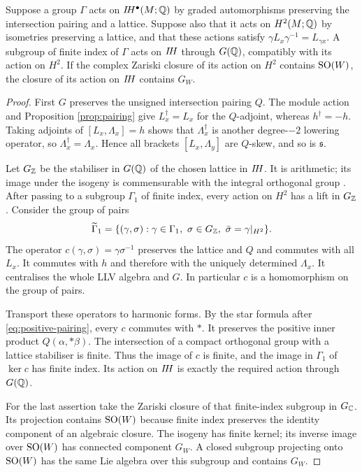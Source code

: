 \begin{proposition}\label{prop:spin}
Suppose a group $\Gamma$ acts on $I\!H^\bullet(M;\mathbb Q)$ by graded
automorphisms preserving the intersection pairing and a lattice.
Suppose also that it acts on $H^2(M;\mathbb Q)$ by isometries preserving
a lattice, and that these actions satisfy
$\gamma L_x\gamma^{-1}=L_{\gamma x}$. A subgroup of finite
index of $\Gamma$ acts on $I\!H$ through $G(\mathbb Q)$, compatibly
with its action on $H^2$. If the complex Zariski closure of its
action on $H^2$ contains $\operatorname{SO}(W)$, the closure of its action on
$I\!H$ contains $G_W$.
\end{proposition}
\begin{proof}
First $G$ preserves the unsigned intersection pairing $Q$.
The module action and Proposition \ref{prop:pairing} give
$L_x^\dagger=L_x$ for the $Q$-adjoint, whereas $h^\dagger=-h$.
Taking adjoints of $[L_x,\Lambda_x]=h$ shows that
$\Lambda_x^\dagger$ is another degree-$-2$ lowering operator,
so $\Lambda_x^\dagger=\Lambda_x$. Hence all brackets
$[L_x,\Lambda_y]$ are $Q$-skew, and so is $\mathfrak s$.

Let $G_{\mathbb Z}$ be the stabiliser in $G(\mathbb Q)$ of the chosen
lattice in $I\!H$. It is arithmetic; its image under the
isogeny is commensurable with the integral orthogonal group
\cite[(5.4.5), (9.4.5)]{morris15}. After passing to a subgroup
$\Gamma_1$ of finite index, every action on $H^2$ has a lift
in $G_{\mathbb Z}$. Consider the group of pairs
\[
 \widetilde\Gamma_1=\{(\gamma,\sigma):\gamma\in\Gamma_1,
 \ \sigma\in G_{\mathbb Z},\ \bar\sigma=\gamma|_{H^2}\}.
\]
The operator $c(\gamma,\sigma)=\gamma\sigma^{-1}$ preserves
the lattice and $Q$ and commutes with all $L_x$. It commutes
with $h$ and therefore with the uniquely determined
$\Lambda_x$. It centralises the whole LLV algebra and $G$.
In particular $c$ is a homomorphism on the group of pairs.

Transport these operators to harmonic forms. By the star
formula after \eqref{eq:positive-pairing}, every $c$ commutes
with $*$. It preserves the positive inner product
$Q(\alpha,*\beta)$. The intersection of a compact orthogonal
group with a lattice stabiliser is finite. Thus the image of
$c$ is finite, and the image in $\Gamma_1$ of $\ker c$ has
finite index. Its action on $I\!H$ is exactly the required
action through $G(\mathbb Q)$.

For the last assertion take the Zariski closure of that
finite-index subgroup in $G_{\mathbb C}$. Its projection contains
$\operatorname{SO}(W)$ because finite index preserves the identity component
of an algebraic closure. The isogeny has finite kernel; its
inverse image over $\operatorname{SO}(W)$ has connected component $G_W$.
A closed subgroup projecting onto $\operatorname{SO}(W)$ has the same Lie
algebra over this subgroup and contains $G_W$.
\end{proof}


